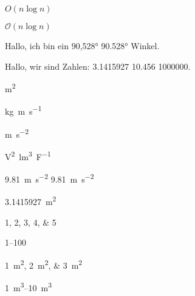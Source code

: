 \documentclass[20pt,ngerman]{scrartcl}
\begin{document}
$O(n\log{}n)$ %
 
$\mathcal{O}(n\log{}n)$ %



Hallo, ich bin ein \ang{90,528} \ang{90.528} Winkel.

Hallo, wir sind Zahlen: \num{3,1415927} \num{10,456} \num{1000000}.

\si{m^2}

\si{kg.m.s^{-1}}

\si{\metre \per  \second^2}

\si{\square\volt\cubic\lumen\per\farad}


\SI{9,81}{m.s^{-2}} \SI{9,81}{m\per \second^2}

\SI{3,1415927}{m^2}


\numlist{1;2;3;4;5}

\numrange{1}{100}

\SIlist{1;2;3}{m^2}

\SIrange{1}{10}{m^3}
\end{document}
